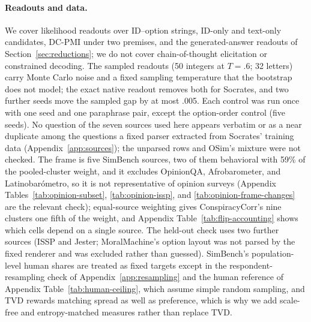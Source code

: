 \documentclass[11pt]{article}
\begin{document}
\paragraph{Readouts and data.}
We cover likelihood readouts over ID--option strings, ID-only and text-only
candidates, DC-PMI under two premises, and the generated-answer readouts of Section~\ref{sec:reductions};
we do not cover chain-of-thought elicitation or constrained decoding. The
sampled readouts (50 integers at $T{=}.6$; 32 letters) carry Monte Carlo
noise and a fixed sampling temperature that the bootstrap does not model; the
exact native readout removes both for Socrates, and two further seeds move
the sampled gap by at most .005. Each control was run once with one seed and one paraphrase pair, except the option-order control (five seeds). No question of the seven sources used here appears
verbatim or as a near duplicate among the questions a fixed parser extracted
from Socrates' training data (Appendix~\ref{app:sources}); the unparsed rows
and OSim's mixture were not checked. The frame is
five SimBench sources, two of them behavioral with 59\% of the pooled-cluster
weight, and it excludes OpinionQA, Afrobarometer, and Latinobar\'ometro, so
it is not representative of opinion surveys (Appendix
Tables~\ref{tab:opinion-subset}, \ref{tab:opinion-issp}, and
\ref{tab:opinion-frame-changes} are the relevant check); equal-source
weighting gives ConspiracyCorr's nine clusters one fifth of the weight, and
Appendix Table~\ref{tab:flip-accounting} shows which cells depend on a
single source. The held-out check uses two further sources (ISSP and Jester; MoralMachine's option layout was not parsed
by the fixed renderer and was excluded rather than guessed). SimBench's
population-level human shares are treated as fixed targets except in the
respondent-resampling check of Appendix~\ref{app:resampling} and the human
reference of Appendix Table~\ref{tab:human-ceiling}, which assume simple random sampling, and TVD
rewards matching spread as well as preference, which is why we add
scale-free and entropy-matched measures rather than replace TVD.
\end{document}
